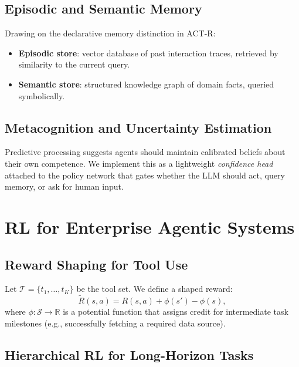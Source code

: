 \documentclass[12pt,a4paper]{article}
\begin{document}
\subsection{Episodic and Semantic Memory}

Drawing on the declarative memory distinction in ACT-R:

\begin{itemize}[noitemsep]
  \item \textbf{Episodic store}: vector database of past interaction traces, retrieved by
        similarity to the current query.
  \item \textbf{Semantic store}: structured knowledge graph of domain facts, queried
        symbolically.
\end{itemize}

\subsection{Metacognition and Uncertainty Estimation}

Predictive processing suggests agents should maintain calibrated beliefs about their own
competence. We implement this as a lightweight \emph{confidence head} attached to the policy
network that gates whether the LLM should act, query memory, or ask for human input.

\section{RL for Enterprise Agentic Systems}

\subsection{Reward Shaping for Tool Use}

Let $\mathcal{T} = \{t_1, \ldots, t_K\}$ be the tool set. We define a shaped reward:
\begin{equation}
  \tilde{R}(s, a) = R(s, a) + \phi(s') - \phi(s),
\end{equation}
where $\phi: \mathcal{S} \to \mathbb{R}$ is a potential function that assigns credit for
intermediate task milestones (e.g., successfully fetching a required data source).

\subsection{Hierarchical RL for Long-Horizon Tasks}
\end{document}
